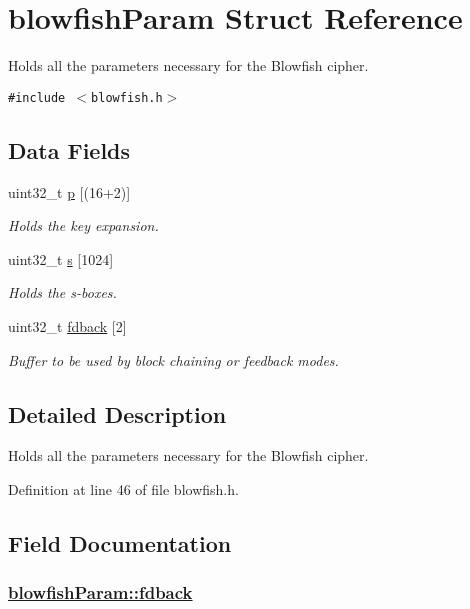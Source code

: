 \hypertarget{structblowfishParam}{
\section{blowfish\-Param Struct Reference}
\label{structblowfishParam}
}
Holds all the parameters necessary for the Blowfish cipher.  


{\tt \#include $<$blowfish.h$>$}

\subsection*{Data Fields}
\begin{CompactItemize}
\item 
uint32\_\-t \hyperlink{structblowfishParam_o0}{p} \mbox{[}(16+2)\mbox{]}
\begin{CompactList}\small\item\em Holds the key expansion. \item\end{CompactList}\item 
uint32\_\-t \hyperlink{structblowfishParam_o1}{s} \mbox{[}1024\mbox{]}
\begin{CompactList}\small\item\em Holds the s-boxes. \item\end{CompactList}\item 
uint32\_\-t \hyperlink{structblowfishParam_o2}{fdback} \mbox{[}2\mbox{]}
\begin{CompactList}\small\item\em Buffer to be used by block chaining or feedback modes. \item\end{CompactList}\end{CompactItemize}


\subsection{Detailed Description}
Holds all the parameters necessary for the Blowfish cipher. 

Definition at line 46 of file blowfish.h.

\subsection{Field Documentation}
\hypertarget{structblowfishParam_o2}{
\subsubsection[fdback]{\setlength{\rightskip}{0pt plus 5cm}\hyperlink{structblowfishParam_o2}{blowfish\-Param::fdback}}}
\label{structblowfishParam_o2}



